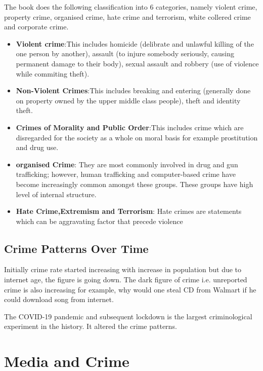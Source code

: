 \documentclass{article}
\begin{document}
The book does the following classification into 6 categories, namely violent crime, property crime, organised crime, hate crime and terrorism, white collered crime and corporate crime.

\begin{itemize}
    \item \textbf{Violent crime}:This includes homicide (delibrate and unlawful killing of the one person by another), assault (to injure somebody seriously, causing permanent damage to their body), sexual assault and robbery (use of violence while commiting theft).

    \item \textbf{Non-Violent Crimes}:This includes breaking and entering (generally done on property owned by the upper middle class people), theft and identity theft.

    \item \textbf{Crimes of Morality and Public Order}:This includes crime which are disregarded for the society as a whole on moral basis for example prostitution and drug use.
    
    \item \textbf{organised Crime}: They are most commonly involved in drug and gun trafficking; however, human trafficking and computer-based crime have become increasingly common amongst these groups. These groups have high level of internal structure.
    
    \item \textbf{Hate Crime,Extremism and Terrorism}: Hate crimes are statements which can be aggravating factor that precede violence
    
\end{itemize}

\subsection{Crime Patterns Over Time}

Initially crime rate started increasing with increase in population but due to internet age, the figure is going down. The dark figure of crime i.e. unreported crime is also increasing for example, why would one steal CD from Walmart if he could download song from internet.

The COVID-19 pandemic and subsequent lockdown is the largest criminological experiment in the history. It altered the crime patterns.

\section{Media and Crime}
\end{document}
